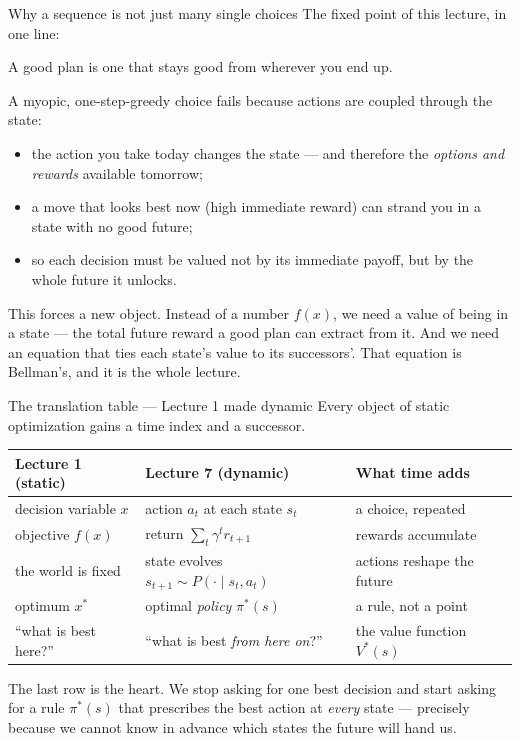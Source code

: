 \documentclass[10pt, aspectratio=169]{beamer}
\begin{document}
\begin{frame}{Why a sequence is not just many single choices}
The fixed point of this lecture, in one line:
\begin{center}\large
\alert{A good plan is one that stays good from wherever you end up.}
\end{center}
\medskip

\pause
A myopic, one-step-greedy choice fails because actions are \alert{coupled through the state}:
\begin{itemize}\setlength\itemsep{2pt}
\item the action you take today changes the state --- and therefore the \emph{options and rewards} available tomorrow;
\item a move that looks best now (high immediate reward) can strand you in a state with no good future;
\item so each decision must be valued not by its immediate payoff, but by \alert{the whole future it unlocks}.
\end{itemize}
\medskip

\pause
This forces a new object. Instead of a number $f(x)$, we need a \alert{value of being in a state} --- the total future reward a good plan can extract from it. And we need an equation that ties each state's value to its successors'. That equation is Bellman's, and it is the whole lecture.
\end{frame}

\begin{frame}{The translation table --- Lecture 1 made dynamic}
Every object of static optimization gains a time index and a successor.
\medskip
\begin{center}\scriptsize\renewcommand{\arraystretch}{1.55}
\begin{tabular}{l|l|l}
\textbf{Lecture 1 (static)} & \textbf{Lecture 7 (dynamic)} & \textbf{What time adds} \\
\hline
decision variable $x$ & action $a_t$ at each state $s_t$ & a choice, repeated \\
objective $f(x)$ & return $\sum_t \gamma^t r_{t+1}$ & rewards accumulate \\
the world is fixed & state evolves $s_{t+1}\sim P(\cdot\mid s_t,a_t)$ & actions reshape the future \\
optimum $x^*$ & optimal \emph{policy} $\pi^*(s)$ & a rule, not a point \\
``what is best here?'' & ``what is best \emph{from here on}?'' & the value function $V^*(s)$ \\
\end{tabular}
\end{center}
\medskip

\pause
The last row is the heart. We stop asking for one best decision and start asking for a \alert{rule} $\pi^*(s)$ that prescribes the best action at \emph{every} state --- precisely because we cannot know in advance which states the future will hand us.
\end{frame}
\end{document}

